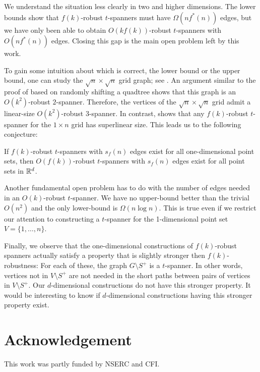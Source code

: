 \documentclass{patmorin}
\begin{document}
We understand the situation less clearly in two and higher dimensions.
The lower bounds show that $f(k)$-robust $t$-spanners must have
$\Omega(nf^*(n))$ edges, but we have only been able to obtain
$O(kf(k))$-robust $t$-spanners with $O(nf^*(n))$ edges.  Closing this
gap is the main open problem left by this work.

To gain some intuition about which is correct, the lower bound
or the upper bound, one can study the $\sqrt{n}\times\sqrt{n}$
grid graph; see .  An argument similar to the proof of
 based on randomly shifting a quadtree shows that this
graph is an $O(k^2)$-robust $2$-spanner.  Therefore, the vertices of
the $\sqrt{n}\times\sqrt{n}$ grid admit a linear-size $O(k^2)$-robust
3-spanner.  In contrast,  shows that any
$f(k)$-robust $t$-spanner for the $1\times n$ grid has superlinear size.
This leads us to the following conjecture:

\begin{conj}
If $f(k)$-robust $t$-spanners with $s_f(n)$ edges exist for all one-dimensional point sets, then $O(f(k))$-robust $t$-spanners with $s_f(n)$ edges exist for all point sets in $\mathbb{R}^d$.
\end{conj}

Another fundamental open problem has to do with the number of edges needed
in an $O(k)$-robust $t$-spanner.  We have no upper-bound better than the
trivial $O(n^2)$ and the only lower-bound is $\Omega(n\log n)$.  This is
true even if we restrict our attention to constructing a $t$-spanner
for the 1-dimensional point set $V=\{1,\ldots,n\}$.

Finally, we observe that the one-dimensional constructions of
$f(k)$-robust spanners actually satisfy a property that is slightly
stronger then $f(k)$-robustness:  For each of these, the graph $G\setminus
S^+$ is a $t$-spanner.  In other words, vertices not in $V\setminus
S^+$ are not needed in the short paths between pairs of vertices in
$V\setminus S^+$.  Our $d$-dimensional constructions do not have this
stronger property.  It would be interesting to know if $d$-dimensional
constructions having this stronger property exist.

\section*{Acknowledgement}

This work was partly funded by NSERC and CFI.



\end{document}
